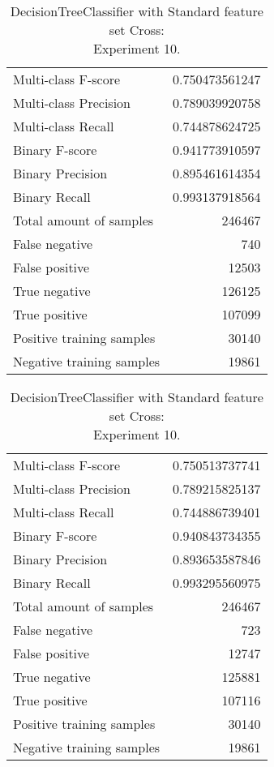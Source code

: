 \begin{table}[H]
\begin{minipage}{0.5\textwidth}
\caption{DecisionTreeClassifier with Standard feature set Cross: \\Experiment 9.}
\centering
\begin{tabular}{l r}
\toprule
Multi-class F-score & 0.750473561247 \\
Multi-class Precision & 0.789039920758 \\
Multi-class Recall & 0.744878624725 \\
\midrule
Binary F-score & 0.941773910597 \\
Binary Precision & 0.895461614354 \\
Binary Recall & 0.993137918564 \\
\midrule
Total amount of samples & 246467 \\
False negative & 740 \\
False positive & 12503 \\
True negative & 126125 \\
True positive & 107099 \\
\midrule
Positive training samples & 30140 \\
Negative training samples & 19861 \\
\bottomrule
\end{tabular}
\end{minipage}
\hfillx
\begin{minipage}{0.5\textwidth}
\caption{DecisionTreeClassifier with Standard feature set Cross: \\Experiment 10.}
\centering
\begin{tabular}{l r}
\toprule
Multi-class F-score & 0.750513737741 \\
Multi-class Precision & 0.789215825137 \\
Multi-class Recall & 0.744886739401 \\
\midrule
Binary F-score & 0.940843734355 \\
Binary Precision & 0.893653587846 \\
Binary Recall & 0.993295560975 \\
\midrule
Total amount of samples & 246467 \\
False negative & 723 \\
False positive & 12747 \\
True negative & 125881 \\
True positive & 107116 \\
\midrule
Positive training samples & 30140 \\
Negative training samples & 19861 \\
\bottomrule
\end{tabular}
\end{minipage}
\end{table}

